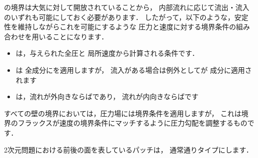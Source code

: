 の境界は大気に対して開放されていることから，
内部流れに応じて流出・流入のいずれも可能にしておく必要があります．
したがって，以下のような，安定性を維持しながらこれを可能にするような
圧力と速度に対する境界条件の組み合わせを用いることになります．
\begin{itemize}
 \item {}は，与えられた全圧と
       局所速度から計算される条件です．
 \item {}は
       全成分にを適用しますが，
       流入がある場合は例外としてが
%
       成分に適用されます
 \item {}は，流れが外向きならばであり，
       流れが内向きならばです
\end{itemize}
すべての壁の境界においては，圧力場には境界条件を適用しますが，
これは境界のフラックスが速度の境界条件にマッチするように圧力勾配を調整するものです．

2次元問題における前後の面を表しているパッチは，
通常通りタイプにします．


